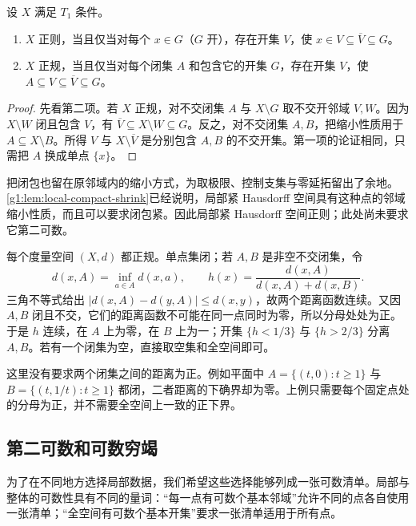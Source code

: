 \begin{lemma}\label{g1:lem:regular-normal-shrink}
	设 \(X\) 满足 \(T_1\) 条件。
	\begin{enumerate}
		\item \(X\) 正则，当且仅当对每个 \(x\in G\)（\(G\) 开），存在开集 \(V\)，使 \(x\in V\subseteq\overline V\subseteq G\)。
		\item \(X\) 正规，当且仅当对每个闭集 \(A\) 和包含它的开集 \(G\)，存在开集 \(V\)，使 \(A\subseteq V\subseteq\overline V\subseteq G\)。
	\end{enumerate}
\end{lemma}
\begin{proof}
	先看第二项。若 \(X\) 正规，对不交闭集 \(A\) 与 \(X\setminus G\) 取不交开邻域 \(V,W\)。因为 \(X\setminus W\) 闭且包含 \(V\)，有 \(\overline V\subseteq X\setminus W\subseteq G\)。反之，对不交闭集 \(A,B\)，把缩小性质用于 \(A\subseteq X\setminus B\)。所得 \(V\) 与 \(X\setminus\overline V\) 是分别包含 \(A,B\) 的不交开集。第一项的论证相同，只需把 \(A\) 换成单点 \(\{x\}\)。
\end{proof}

把闭包也留在原邻域内的缩小方式，为取极限、控制支集与零延拓留出了余地。\cref{g1:lem:local-compact-shrink}已经说明，局部紧 Hausdorff 空间具有这种点的邻域缩小性质，而且可以要求闭包紧。因此局部紧 Hausdorff 空间正则；此处尚未要求它第二可数。

\begin{example}\label{g1:exm:metric-normal}
	每个度量空间 \((X,d)\) 都正规。单点集闭；若 \(A,B\) 是非空不交闭集，令
	\[
		d(x,A)=\inf_{a\in A}d(x,a),\qquad
		h(x)=\frac{d(x,A)}{d(x,A)+d(x,B)}.
	\]
	三角不等式给出 \(|d(x,A)-d(y,A)|\le d(x,y)\)，故两个距离函数连续。又因 \(A,B\) 闭且不交，它们的距离函数不可能在同一点同时为零，所以分母处处为正。于是 \(h\) 连续，在 \(A\) 上为零，在 \(B\) 上为一；开集 \(\{h<1/3\}\) 与 \(\{h>2/3\}\) 分离 \(A,B\)。若有一个闭集为空，直接取空集和全空间即可。
\end{example}

这里没有要求两个闭集之间的距离为正。例如平面中 \(A=\{(t,0):t\ge1\}\) 与 \(B=\{(t,1/t):t\ge1\}\) 都闭，二者距离的下确界却为零。上例只需要每个固定点处的分母为正，并不需要全空间上一致的正下界。

\subsection{第二可数和可数穷竭}
\label{g1:subsec:0403:02}

为了在不同地方选择局部数据，我们希望这些选择能够列成一张可数清单。局部与整体的可数性具有不同的量词：“每一点有可数个基本邻域”允许不同的点各自使用一张清单；“全空间有可数个基本开集”要求一张清单适用于所有点。

